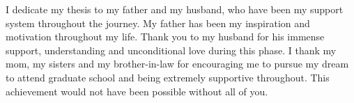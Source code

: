 

I dedicate my thesis to my father and my husband, who have been my support system throughout the journey. My father has been my inspiration and motivation throughout my life. Thank you to my husband for his immense support, understanding and unconditional love during this phase. I thank my mom, my sisters and my brother-in-law for encouraging me to pursue my dream to attend graduate school and being extremely supportive throughout. This achievement would not have been possible without all of you.
